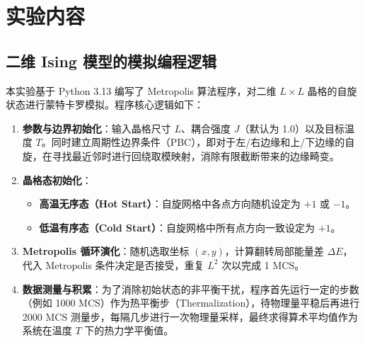 \documentclass[11pt]{article}
\begin{document}
\section{实验内容}

\subsection{二维 Ising 模型的模拟编程逻辑}
本实验基于 Python 3.13 编写了 Metropolis 算法程序，对二维 $L \times L$ 晶格的自旋状态进行蒙特卡罗模拟。程序核心逻辑如下：
\begin{enumerate}
    \item \textbf{参数与边界初始化}：输入晶格尺寸 $L$、耦合强度 $J$（默认为 1.0）以及目标温度 $T$。同时建立周期性边界条件（PBC），即对于左/右边缘和上/下边缘的自旋，在寻找最近邻时进行回绕取模映射，消除有限截断带来的边缘畸变。
    \item \textbf{晶格态初始化}：
        \begin{itemize}
            \item \textbf{高温无序态（Hot Start）}：自旋网格中各点方向随机设定为 $+1$ 或 $-1$。
            \item \textbf{低温有序态（Cold Start）}：自旋网格中所有点方向一致设定为 $+1$。
        \end{itemize}
    \item \textbf{Metropolis 循环演化}：随机选取坐标 $(x, y)$，计算翻转局部能量差 $\Delta E$，代入 Metropolis 条件决定是否接受，重复 $L^2$ 次以完成 1 MCS。
    \item \textbf{数据测量与积累}：为了消除初始状态的非平衡干扰，程序首先运行一定的步数（例如 1000 MCS）作为热平衡步（Thermalization），待物理量平稳后再进行 2000 MCS 测量步，每隔几步进行一次物理量采样，最终求得算术平均值作为系统在温度 $T$ 下的热力学平衡值。
\end{enumerate}
\end{document}
